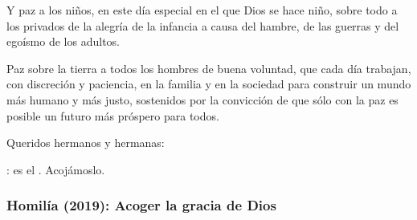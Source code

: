 \begin{body}
	Y paz a los niños, en este día especial en el que Dios se hace niño, sobre todo a los privados de la alegría de la infancia a causa del hambre, de las guerras y del egoísmo de los adultos.
	
	Paz sobre la tierra a todos los hombres de buena voluntad, que cada día trabajan, con discreción y paciencia, en la familia y en la sociedad para construir un mundo más humano y más justo, sostenidos por la convicción de que sólo con la paz es posible un futuro más próspero para todos.
	
	Queridos hermanos y hermanas:
	
	: es el . Acojámoslo.
\end{body}

\subsubsection{Homilía (2019): Acoger la gracia de Dios}


